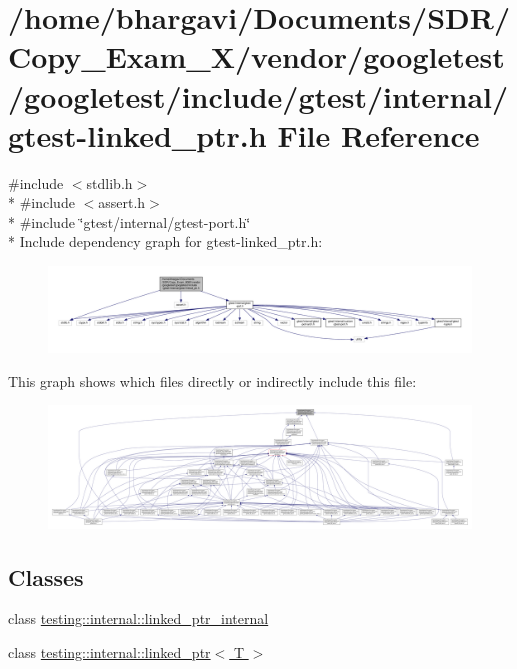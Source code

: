 \hypertarget{gtest-linked__ptr_8h}{}\section{/home/bhargavi/\+Documents/\+S\+D\+R/\+Copy\+\_\+\+Exam\+\_\+X/vendor/googletest/googletest/include/gtest/internal/gtest-\/linked\+\_\+ptr.h File Reference}
\label{gtest-linked__ptr_8h}
{\ttfamily \#include $<$stdlib.\+h$>$}\\*
{\ttfamily \#include $<$assert.\+h$>$}\\*
{\ttfamily \#include \char`\"{}gtest/internal/gtest-\/port.\+h\char`\"{}}\\*
Include dependency graph for gtest-\/linked\+\_\+ptr.h\+:
\nopagebreak
\begin{figure}[H]
\begin{center}
\leavevmode
\includegraphics[width=350pt]{gtest-linked__ptr_8h__incl}
\end{center}
\end{figure}
This graph shows which files directly or indirectly include this file\+:
\nopagebreak
\begin{figure}[H]
\begin{center}
\leavevmode
\includegraphics[width=350pt]{gtest-linked__ptr_8h__dep__incl}
\end{center}
\end{figure}
\subsection*{Classes}
\begin{DoxyCompactItemize}
\item 
class \hyperlink{classtesting_1_1internal_1_1linked__ptr__internal}{testing\+::internal\+::linked\+\_\+ptr\+\_\+internal}
\item 
class \hyperlink{classtesting_1_1internal_1_1linked__ptr}{testing\+::internal\+::linked\+\_\+ptr$<$ T $>$}
\end{DoxyCompactItemize}
